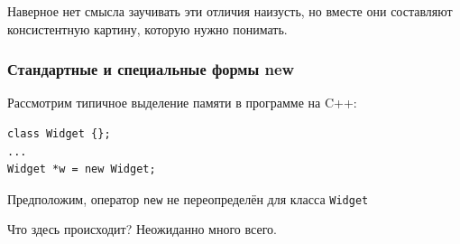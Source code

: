 \documentclass[a4paper,12pt,oneside]{article}
\begin{document}
Наверное нет смысла заучивать эти отличия наизусть, но вместе они составляют консистентную картину, которую нужно понимать.

\subsubsection{Стандартные и специальные формы new}\label{PlacementNew}

Рассмотрим типичное выделение памяти в программе на C++:

\begin{lstlisting}
class Widget {};
...
Widget *w = new Widget;
\end{lstlisting}

Предположим, оператор \lstinline!new! не переопределён для класса \lstinline!Widget!

Что здесь происходит? Неожиданно много всего.
\end{document}
